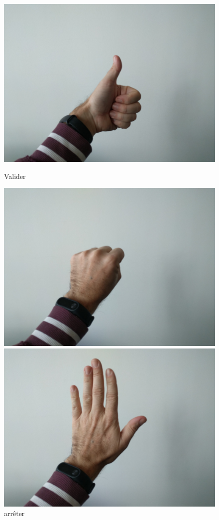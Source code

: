 \begin{figure}
\begin{minipage}[c]{.32\linewidth}
		\includegraphics[width=\columnwidth]{figures/3.jpg}%
		\caption*{Valider}%
	\end{minipage}
	\centering
	\begin{minipage}[c]{.32\linewidth}
		\includegraphics[width=\columnwidth]{figures/4.jpg}%
		\caption*{arrêter}%
	\end{minipage}
	\begin{minipage}[c]{.32\linewidth}
		\includegraphics[width=\columnwidth]{figures/5.jpg}%

\end{minipage}
\end{figure}
